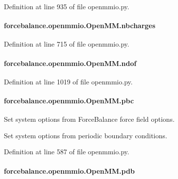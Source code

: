 Definition at line 935 of file openmmio.\-py.

\hypertarget{classforcebalance_1_1openmmio_1_1OpenMM_ab874ef6b2f3aa456f9f63b46ee198035}{
\paragraph[{nbcharges}]{\setlength{\rightskip}{0pt plus 5cm}forcebalance.\-openmmio.\-Open\-M\-M.\-nbcharges}}\label{classforcebalance_1_1openmmio_1_1OpenMM_ab874ef6b2f3aa456f9f63b46ee198035}


Definition at line 715 of file openmmio.\-py.

\hypertarget{classforcebalance_1_1openmmio_1_1OpenMM_ac2a2dd00a4f7c12d79f93eaa66dd8dab}{
\paragraph[{ndof}]{\setlength{\rightskip}{0pt plus 5cm}forcebalance.\-openmmio.\-Open\-M\-M.\-ndof}}\label{classforcebalance_1_1openmmio_1_1OpenMM_ac2a2dd00a4f7c12d79f93eaa66dd8dab}


Definition at line 1019 of file openmmio.\-py.

\hypertarget{classforcebalance_1_1openmmio_1_1OpenMM_a423cc02bb7781ae7aa593960a5912b52}{
\paragraph[{pbc}]{\setlength{\rightskip}{0pt plus 5cm}forcebalance.\-openmmio.\-Open\-M\-M.\-pbc}}\label{classforcebalance_1_1openmmio_1_1OpenMM_a423cc02bb7781ae7aa593960a5912b52}


Set system options from Force\-Balance force field options. 

Set system options from periodic boundary conditions. 

Definition at line 587 of file openmmio.\-py.

\hypertarget{classforcebalance_1_1openmmio_1_1OpenMM_ad7968c9ed8ce2b911bb86f3a0181b3be}{
\paragraph[{pdb}]{\setlength{\rightskip}{0pt plus 5cm}forcebalance.\-openmmio.\-Open\-M\-M.\-pdb}}\label{classforcebalance_1_1openmmio_1_1OpenMM_ad7968c9ed8ce2b911bb86f3a0181b3be}


